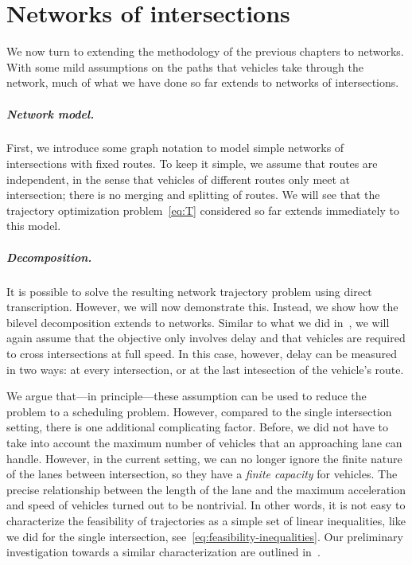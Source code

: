 \documentclass[a4paper]{report}
\theoremstyle{definition}
\theoremstyle{plain}
\begin{document}

\chapter{Networks of intersections}\label{chap:network-learning}

We now turn to extending the methodology of the previous chapters to networks.
With some mild assumptions on the paths that vehicles take through the network,
much of what we have done so far extends to networks of intersections.

\paragraph{Network model.}
First, we introduce some graph notation to model simple networks of
intersections with fixed routes. To keep it simple, we assume that routes are
independent, in the sense that vehicles of different routes only meet at
intersection; there is no merging and splitting of routes.
%
We will see that the trajectory optimization problem~\eqref{eq:T} considered so
far extends immediately to this model.

\paragraph{Decomposition.}

It is possible to solve the resulting network trajectory problem using direct
transcription. However, we will now demonstrate this. Instead, we show how the
bilevel decomposition extends to networks. Similar to what we did
in~, we will again assume that the objective only
involves delay and that vehicles are required to cross intersections at full
speed.
%
In this case, however, delay can be measured in two ways: at every intersection,
or at the last intesection of the vehicle's route.

We argue that---in principle---these assumption can be used to reduce the
problem to a scheduling problem. However, compared to the single intersection
setting, there is one additional complicating factor. Before, we did not have to
take into account the maximum number of vehicles that an approaching lane can
handle. However, in the current setting, we can no longer ignore the finite
nature of the lanes between intersection, so they have a \emph{finite capacity}
for vehicles.
%
The precise relationship between the length of the lane and the maximum
acceleration and speed of vehicles turned out to be nontrivial.
%
In other words, it is not easy to characterize the feasibility of trajectories
as a simple set of linear inequalities, like we did for the single intersection,
see~\eqref{eq:feasibility-inequalities}.
%
Our preliminary investigation towards a similar characterization are outlined
in~.
\end{document}
